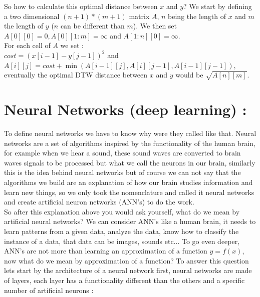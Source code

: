 \documentclass[10pt,a4paper]{article}
\begin{document}
So how to calculate this optimal distance between $ x $ and $ y $? We start by defining a two dimensional $ (n+1)*(m+1) $ matrix $ A $, $ n $ being the length of $ x $ and $ m $ the length of $ y $ ($ n $ can be different than $ m $). We then set $ A[0][0] = 0, A[0][1:m] = \infty $ and $ A[1:n][0] = \infty $.\\ For each cell of $ A $ we set :\\ $ cost = (x[i-1] - y[j-1])^2 $ and $ A[i][j] = cost + \min(A[i-1][j], A[i][j-1], A[i-1][j-1]) $, eventually the optimal DTW distance between $ x $ and $ y $ would be $ \sqrt{A[n][m]} $.

\section{Neural Networks (deep learning) :}
To define neural networks we have to know why were they called like that. Neural networks are a set of algorithms inspired by the functionality of the human brain, for example when we hear a sound, these sound waves are converted to brain waves signals to be processed but what we call the neurons in our brain, similarly this is the idea behind neural networks but of course we can not say that the algorithms we build are an explanation of how our brain studies information and learn new things, so we only took the nomenclature and called it neural networks and create artificial neuron networks (ANN's) to do the work.\\
So after this explanation above you would ask yourself, what do we mean by artificial neural networks? We can consider ANN's like a human brain, it needs to learn patterns from a given data, analyze the data, know how to classify the instance of a data, that data can be images, sounds etc... To go even deeper, ANN's are not more than learning an approximation of a function $ y = f(x) $, now what do we mean by approximation of a function? To answer this question lets start by the architecture of a neural network first, neural networks are made of layers, each layer has a functionality different than the others and a specific number of artificial neurons :
\end{document}
